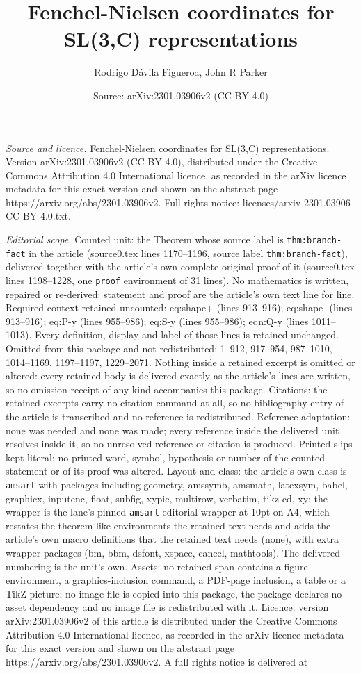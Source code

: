 \documentclass[10pt,a4paper]{amsart}
\title[Fenchel-Nielsen coordinates for SL(3,C) representations]{Fenchel-Nielsen coordinates for SL(3,C) representations}
\author{Rodrigo D\'avila Figueroa, John R Parker}
\date{Source: arXiv:2301.03906v2 (CC BY 4.0)}
\begin{document}
\maketitle

\noindent\emph{Source and licence.} Fenchel-Nielsen coordinates for SL(3,C) representations. Version arXiv:2301.03906v2 (CC BY 4.0), distributed under the Creative Commons Attribution 4.0 International licence, as recorded in the arXiv licence metadata for this exact version and shown on the abstract page https://arxiv.org/abs/2301.03906v2. Full rights notice: licenses/arxiv-2301.03906-CC-BY-4.0.txt.\par\smallskip

\noindent\textit{Editorial scope.} Counted unit: the Theorem whose source label is \texttt{thm:branch-fact} in the article (source0.tex lines 1170--1196, source label \texttt{thm:branch-fact}), delivered together with the article's own complete original proof of it (source0.tex lines 1198--1228, one \texttt{proof} environment of 31 lines). No mathematics is written, repaired or re-derived: statement and proof are the article's own text line for line. Required context retained uncounted: eq:shape+ (lines 913--916); eq:shape- (lines 913--916); eq:P-y (lines 955--986); eq:S-y (lines 955--986); eqn:Q-y (lines 1011--1013). Every definition, display and label of those lines is retained unchanged. Omitted from this package and not redistributed: 1--912, 917--954, 987--1010, 1014--1169, 1197--1197, 1229--2071. Nothing inside a retained excerpt is omitted or altered: every retained body is delivered exactly as the article's lines are written, so no omission receipt of any kind accompanies this package. Citations: the retained excerpts carry no citation command at all, so no bibliography entry of the article is transcribed and no reference is redistributed. Reference adaptation: none was needed and none was made; every reference inside the delivered unit resolves inside it, so no unresolved reference or citation is produced. Printed slips kept literal: no printed word, symbol, hypothesis or number of the counted statement or of its proof was altered. Layout and class: the article's own class is \texttt{amsart} with packages including geometry, amssymb, amsmath, latexsym, babel, graphicx, inputenc, float, subfig, xypic, multirow, verbatim, tikz-cd, xy; the wrapper is the lane's pinned \texttt{amsart} editorial wrapper at 10pt on A4, which restates the theorem-like environments the retained text needs and adds the article's own macro definitions that the retained text needs (none), with extra wrapper packages (bm, bbm, dsfont, xspace, cancel, mathtools). The delivered numbering is the unit's own. Assets: no retained span contains a figure environment, a graphics-inclusion command, a PDF-page inclusion, a table or a TikZ picture; no image file is copied into this package, the package declares no asset dependency and no image file is redistributed with it. Licence: version arXiv:2301.03906v2 of this article is distributed under the Creative Commons Attribution 4.0 International licence, as recorded in the arXiv licence metadata for this exact version and shown on the abstract page https://arxiv.org/abs/2301.03906v2. A full rights notice is delivered at 
\end{document}
